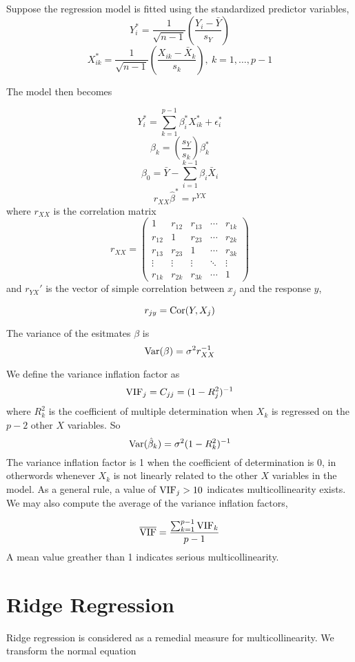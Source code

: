 Suppose the regression model is fitted using the standardized predictor variables, 
\[Y_i^* = \frac{1}{\sqrt{n-1}}\left(\frac{Y_i - \bar{Y}}{s_Y}\right)\]
\[X_{ik}^* = \frac{1}{\sqrt{n-1}}\left(\frac{X_{ik} - \bar{X}_k}{s_k}\right), \ k = 1, \ldots, p-1\]

The model then becomes

\[Y_i^* = \sum_{k=1}^{p-1} \beta_i^*X_{ik}^* + \epsilon_i^*\]
\[\beta_k = \left(\frac{s_Y}{s_k}\right)\beta_k^*\]
\[\beta_0 = \bar{Y} - \sum_{i=1}^{k-1}\beta_i\bar{X}_i\]
\[r_{XX}\hat{\beta}^* = r^{YX}\]
where $r_{XX}$ is the correlation matrix 
\[r_{XX} = \begin{pmatrix}
    1 & r_{12} & r_{13} & \cdots & r_{1k}\\
    r_{12} & 1 & r_{23} & \cdots & r_{2k}\\
    r_{13} & r_{23} & 1 & \cdots & r_{3k} \\
    \vdots & \vdots & \vdots & \ddots & \vdots \\
    r_{1k} & r_{2k} & r_{3k} & \cdots & 1 
\end{pmatrix}\]
and $r_{YX}'$ is the vector of simple correlation between $x_j$ and the response $y$, 

\[r_{jy} = \operatorname{Cor}(Y, X_j)\]

The variance of the esitmates $\beta$ is 
\[\operatorname{Var}(\beta) = \sigma^2r_{XX}^{-1}\]

We define the variance inflation factor as 
\[\operatorname{VIF}_j = C_{jj} = (1-R_j^2)^{-1}\]
where $R_k^2$ is the coefficient of multiple determination when $X_k$ is regressed on the $p-2$ other $X$ variables. So 
\[\operatorname{Var}(\hat{\beta}_k) = \sigma^2(1- R_k^{2})^{-1}\]
The variance inflation factor is 1 when the coefficient of determination is 0, in otherwords whenever $X_k$ is not linearly related to the other $X$ variables in the model. As a general rule, a value of $\operatorname{VIF}_j > 10$ indicates multicollinearity exists. We may also compute the average of the variance inflation factors,

\[\overline{\operatorname{VIF}} = \frac{\sum_{k=1}^{p-1}\operatorname{VIF}_k}{p-1}\]
\noindent
A mean value greather than 1 indicates serious multicollinearity.

\section{Ridge Regression}

Ridge regression is considered as a remedial measure for multicollinearity. We transform the normal equation 

